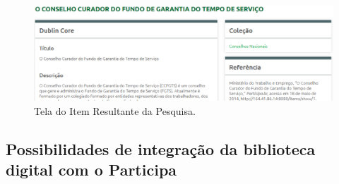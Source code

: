 \graphicspath{{figuras/prototipo/}}
\begin{figure}[H]
\centering
\includegraphics[width=1.0\textwidth]{resultante-pesquisa}
\caption{Tela do Item Resultante da Pesquisa.}
\label{fig:resulpesquisa_prototipo}
\end{figure}

\subsection{Possibilidades de integração da biblioteca digital com o Participa}
